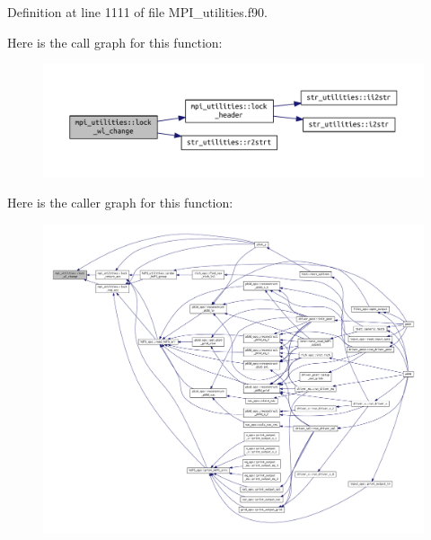 Definition at line 1111 of file M\+P\+I\+\_\+utilities.\+f90.

Here is the call graph for this function\+:\nopagebreak
\begin{figure}[H]
\begin{center}
\leavevmode
\includegraphics[width=350pt]{namespacempi__utilities_a3b0349e5ec825e14083e3126c3e7ba65_cgraph}
\end{center}
\end{figure}
Here is the caller graph for this function\+:\nopagebreak
\begin{figure}[H]
\begin{center}
\leavevmode
\includegraphics[width=350pt]{namespacempi__utilities_a3b0349e5ec825e14083e3126c3e7ba65_icgraph}
\end{center}
\end{figure}
\mbox{\label{namespacempi__utilities_a128702990bd5fddc582e8fabcffc82b2}} 
